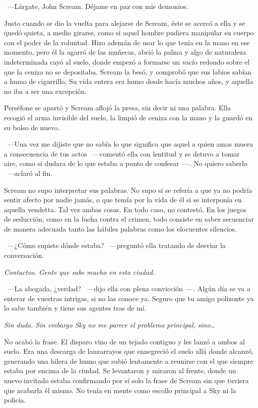 ~---Lárgate, John Scream. Déjame en paz con mis demonios.

Justo cuando se dio la vuelta para alejarse de Scream, éste se acercó a ella y se quedó quieta, a medio girarse, como si aquel hombre pudiera manipular su cuerpo con el poder de la voluntad. Hizo ademán de usar lo que tenía en la mano en ese momento, pero él la agarró de las muñecas, abrió la palma y algo de naturaleza indeterminada cayó al suelo, donde empezó a formarse un vacío redondo sobre el que la ceniza no se depositaba. Scream la besó, y comprobó que sus labios sabían a humo de cigarrillo. Su vida entera era humo desde hacía muchos años, y aquella no iba a ser una excepción.

Perséfone se apartó y Scream aflojó la presa, sin decir ni una palabra. Ella recogió el arma invisible del suelo, la limpió de ceniza con la mano y la guardó en su bolso de nuevo.

~---Una vez me dijiste que no sabía lo que significa que aquel a quien amas muera a consecuencia de tus actos ~---comentó ella con lentitud y se detuvo a tomar aire, como si dudara de lo que estaba a punto de confesar~---. No quiero saberlo ~---aclaró al fin.

Scream no supo interpretar sus palabras. No supo si se refería a que ya no podría sentir afecto por nadie jamás, o que temía por la vida de él si se interponía en aquella vendetta. Tal vez ambas cosas. En todo caso, no contestó. En los juegos de seducción, como en la lucha contra el crimen, todo consiste en saber secuenciar de manera adecuada tanto las hábiles palabras como los elocuentes silencios.

~---¿Cómo supiste dónde estaba? ~---preguntó ella tratando de desviar la conversación.

\emph{Contactos. Gente que sabe mucho en esta ciudad.}

~---La abogada, ¿verdad? ~---dijo ella con plena convicción~---. Algún día se va a enterar de vuestras intrigas, si no las conoce ya. Seguro que tu amigo polizonte ya lo sabe también y tiene sus agentes tras de mí.

\emph{Sin duda. Sin embargo Sky no me parece el problema principal, sino\dots}

No acabó la frase. El disparo vino de un tejado contiguo y les lanzó a ambos al suelo. Era una descarga de lanzarrayos que ennegreció el suelo allá donde alcanzó, generando una hilera de humo que subió lentamente a reunirse con el que siempre estaba por encima de la ciudad. Se levantaron y miraron al frente, donde un nuevo invitado estaba confirmando por sí solo la frase de Scream sin que tuviera que acabarla él mismo. No tenía en mente como escollo principal a Sky ni la policía.

